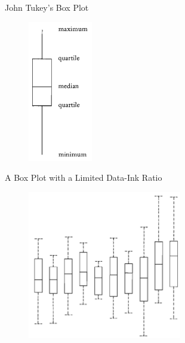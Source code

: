 \documentclass[notes, aspectratio=1610]{beamer}
\begin{document}
\begin{frame}{John Tukey's Box Plot}{}
	\begin{figure}
		\begin{center}
			\includegraphics[width=0.25\textwidth]{images/boxplot.png}
		\end{center}
	\end{figure}
\end{frame}

\begin{frame}{A Box Plot with a Limited Data-Ink Ratio}{}
	\begin{figure}
		\begin{center}
			\includegraphics[width=0.6\textwidth]{images/trad_boxplot.png}
		\end{center}
	\end{figure}
\end{frame}
\end{document}
